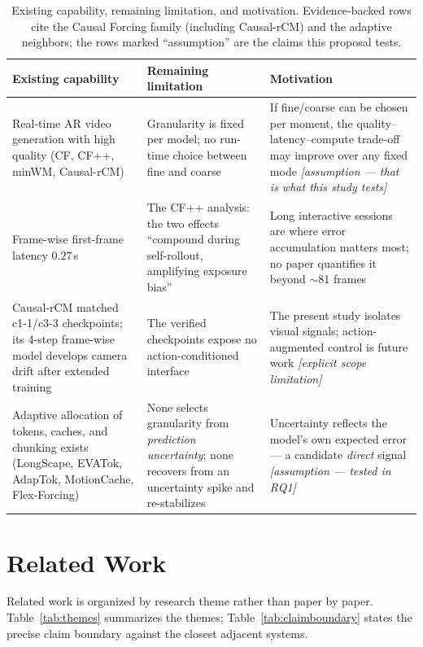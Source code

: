 \documentclass[11pt,a4paper]{article}
\begin{document}
\begin{table}[t]
\centering
\small
\renewcommand{\arraystretch}{1.25}
\begin{tabularx}{\textwidth}{>{\raggedright\arraybackslash}p{4.4cm} >{\raggedright\arraybackslash}p{4.4cm} >{\raggedright\arraybackslash}X}
\toprule
\textbf{Existing capability} & \textbf{Remaining limitation} & \textbf{Motivation} \\
\midrule
Real-time AR video generation with high quality (CF, CF++, minWM, Causal-rCM) & Granularity is fixed per model; no run-time choice between fine and coarse & If fine/coarse can be chosen per moment, the quality--latency--compute trade-off may improve over any fixed mode \emph{[assumption --- that is what this study tests]} \\
Frame-wise first-frame latency $0.27$\,s & The CF++ analysis: the two effects ``compound during self-rollout, amplifying exposure bias'' & Long interactive sessions are where error accumulation matters most; no paper quantifies it beyond $\sim$81 frames \\
Causal-rCM matched c1-1/c3-3 checkpoints; its 4-step frame-wise model develops camera drift after extended training & The verified checkpoints expose no action-conditioned interface & The present study isolates visual signals; action-augmented control is future work \emph{[explicit scope limitation]} \\
Adaptive allocation of tokens, caches, and chunking exists (LongScape, EVATok, AdapTok, MotionCache, Flex-Forcing) & None selects granularity from \emph{prediction uncertainty}; none recovers from an uncertainty spike and re-stabilizes & Uncertainty reflects the model's own expected error --- a candidate \emph{direct} signal \emph{[assumption --- tested in RQ1]} \\
\bottomrule
\end{tabularx}
\caption{Existing capability, remaining limitation, and motivation. Evidence-backed rows cite the Causal Forcing family (including Causal-rCM) and the adaptive neighbors; the rows marked ``assumption'' are the claims this proposal tests.}
\label{tab:motivation}
\end{table}

\section{Related Work}\label{sec:related}

Related work is organized by research theme rather than paper by paper. Table~\ref{tab:themes} summarizes the themes; Table~\ref{tab:claimboundary} states the precise claim boundary against the closest adjacent systems.
\end{document}
